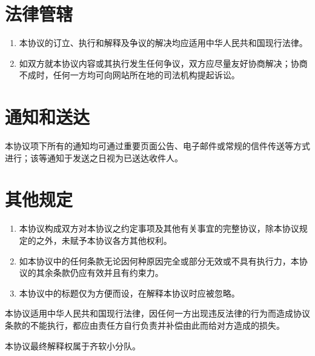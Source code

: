\documentclass[UTF8]{ctexart}
\newcommand{\groupName}{齐软小分队}
\begin{document}
    \section{法律管辖}
        \begin{enumerate}
            \item 本协议的订立、执行和解释及争议的解决均应适用中华人民共和国现行法律。
            \item 如双方就本协议内容或其执行发生任何争议，双方应尽量友好协商解决；协商不成时，任何一方均可向网站所在地的司法机构提起诉讼。
        \end{enumerate}
    \section{通知和送达}
        本协议项下所有的通知均可通过重要页面公告、电子邮件或常规的信件传送等方式进行；该等通知于发送之日视为已送达收件人。
    \section{其他规定}
        \begin{enumerate}
            \item 本协议构成双方对本协议之约定事项及其他有关事宜的完整协议，除本协议规定的之外，未赋予本协议各方其他权利。
            \item 如本协议中的任何条款无论因何种原因完全或部分无效或不具有执行力，本协议的其余条款仍应有效并且有约束力。
            \item 本协议中的标题仅为方便而设，在解释本协议时应被忽略。
        \end{enumerate}
        本协议适用中华人民共和国现行法律，因任何一方出现违反法律的行为而造成协议条款的不能执行，都应由责任方自行负责并补偿由此而给对方造成的损失。

        本协议最终解释权属于{\groupName}。
\end{document}
